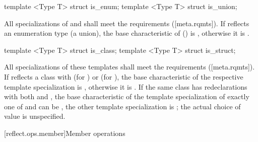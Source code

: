 \begin{std.txt}
\begin{itemdecl}
template <Type T> struct is_enum;
template <Type T> struct is_union;
\end{itemdecl}

\begin{itemdescr}
\pnum
All specializations of  and  shall meet the  requirements ([meta.rqmts]). If  reflects an enumeration type (a union), the base characteristic of  () is , otherwise it is .
\end{itemdescr}

\begin{itemdecl}
template <Type T> struct is_class;
template <Type T> struct is_struct;
\end{itemdecl}

\begin{itemdescr}
\pnum
All specializations of these templates shall meet the  requirements ([meta.rqmts]). If  reflects a class with   (for ) or  (for ), the base characteristic of the respective template specialization is , otherwise it is . If the same class has redeclarations with both   and  , the base characteristic of the template specialization of exactly one of  and  can be , the other template specialization is ; the actual choice of value is unspecified.
\end{itemdescr}
\end{std.txt}

[reflect.ops.member]{Member operations}

